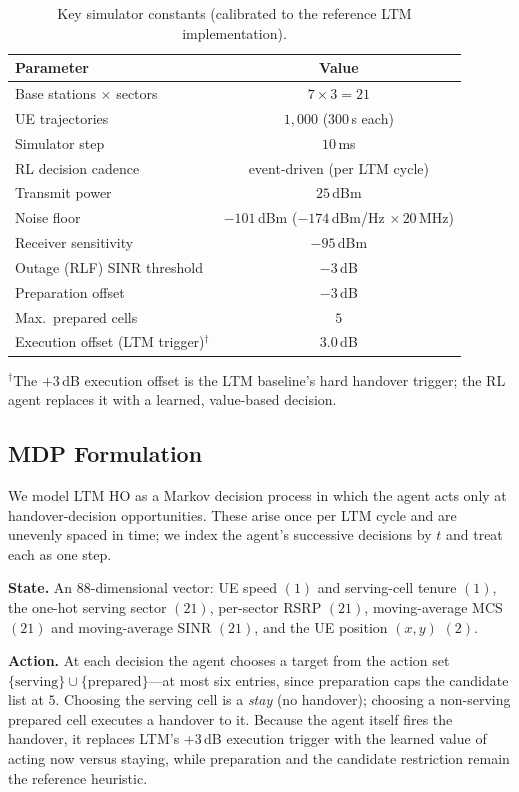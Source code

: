 \documentclass[conference]{IEEEtran}
\begin{document}
\begin{table}[htbp]
\caption{Key simulator constants (calibrated to the reference LTM implementation).}
\label{tab:sysparams}
\centering
 \begin{tabular}{|l|c|}
\hline
\textbf{Parameter} & \textbf{Value} \\
\hline
Base stations $\times$ sectors      & $7 \times 3 = 21$ \\
UE trajectories                     & $1{,}000$ ($300$\,s each) \\
Simulator step                      & $10$\,ms \\
RL decision cadence                 & event-driven (per LTM cycle) \\
Transmit power                      & $25$\,dBm \\
Noise floor                         & $-101$\,dBm ($-174$\,dBm/Hz $\times\,20$\,MHz) \\
Receiver sensitivity                & $-95$\,dBm \\
Outage (RLF) SINR threshold         & $-3$\,dB \\
Preparation offset                  & $-3$\,dB \\
Max.\ prepared cells                & $5$ \\
Execution offset (LTM trigger)$^{\dagger}$ & $3.0$\,dB \\
\hline
\end{tabular}
{\footnotesize $^{\dagger}$The $+3$\,dB execution offset is the LTM baseline's
hard handover trigger; the RL agent replaces it with a learned, value-based
decision.}
\end{table}

\subsection{MDP Formulation}
\label{sec:mdp}
We model LTM HO as a Markov decision process in which the agent acts only at
handover-decision opportunities. These arise once per LTM cycle and are
unevenly spaced in time; we index the agent's successive decisions by $t$ and
treat each as one step.

\textbf{State.} An $88$-dimensional vector: UE speed $(1)$ and serving-cell
tenure $(1)$, the one-hot serving sector $(21)$, per-sector RSRP $(21)$,
moving-average MCS $(21)$ and moving-average SINR $(21)$, and the UE position
$(x,y)$ $(2)$.

\textbf{Action.} At each decision the agent chooses a target from the action set
$\{\text{serving}\}\cup\{\text{prepared}\}$---at most six entries, since
preparation caps the candidate list at $5$. Choosing the serving cell is a
\emph{stay} (no handover); choosing a non-serving prepared cell executes a
handover to it. Because the agent itself fires the handover, it replaces LTM's
$+3$\,dB execution trigger with the learned value of acting now versus staying,
while preparation and the candidate restriction remain the reference heuristic.
\end{document}
